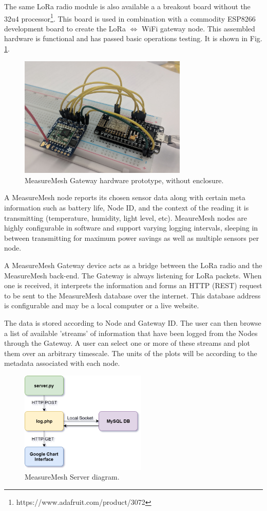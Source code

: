 \documentclass{IEEEtran}
\begin{document}
The same LoRa radio module is also available a a breakout board without the 32u4 processor\footnote{https://www.adafruit.com/product/3072}. This board is used in combination with a commodity ESP8266 development board to create the LoRa $\Longleftrightarrow$ WiFi gateway node. This assembled hardware is functional and has passed basic operations testing. It is shown in Fig. \ref{fig:gatewayproto}.

\begin{figure}
    \centering
    \includegraphics[width=8cm]{images/gatewayPrototype.jpg}
    \caption{MeasureMesh Gateway hardware prototype, without enclosure.}
    \label{fig:gatewayproto}
\end{figure}

A MeasureMesh node reports its chosen sensor data along with certain meta information such as battery life, Node ID, and the context of the reading it is transmitting (temperature, humidity, light level, etc). MeaureMesh nodes are highly configurable in software and support varying logging intervals, sleeping in between transmitting for maximum power savings as well as multiple sensors per node. 

A MeasureMesh Gateway device acts as a bridge between the LoRa radio and the MeasureMesh back-end. The Gateway is always listening for LoRa packets. When one is received, it interprets the information and forms an HTTP (REST) request to be sent to the MeasureMesh database over the internet. This database address is configurable and may be a local computer or a live website.

The data is stored according to Node and Gateway ID. The user can then browse  a list of available 'streams' of information that have been logged from the Nodes through the Gateway. A user can select one or more of these streams and plot them over an arbitrary timescale. The units of the plots will be according to the metadata associated with each node. 

\begin{figure}
    \centering
    \includegraphics[width=6cm]{images/mm-user-interface}
    \caption{MeasureMesh Server diagram.}
    \label{fig:mm-ui-data}
\end{figure}
\end{document}
